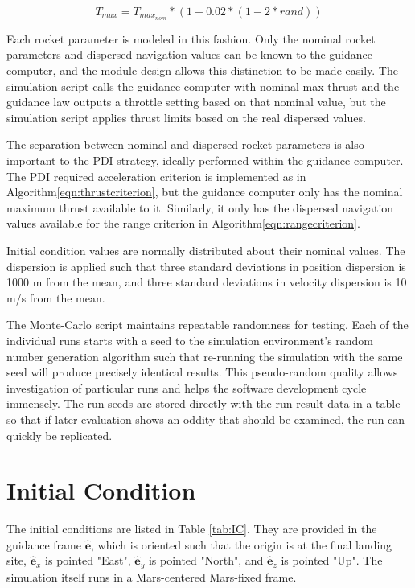\begin{equation}
\label{eqn:thrustdisp}
T_{max} = T_{max_{nom}}*(1+0.02*(1-2*rand))
\end{equation}

Each rocket parameter is modeled in this fashion. Only the nominal rocket parameters and dispersed navigation values can be known to the guidance computer, and the module design allows this distinction to be made easily. The simulation script calls the guidance computer with nominal max thrust and the guidance law outputs a throttle setting based on that nominal value, but the simulation script applies thrust limits based on the real dispersed values. 

The separation between nominal and dispersed rocket parameters is also important to the PDI strategy, ideally performed within the guidance computer. The PDI required acceleration criterion is implemented as in Algorithm\:\ref{eqn:thrustcriterion}, but the guidance computer only has the nominal maximum thrust available to it. Similarly, it only has the dispersed navigation values available for the range criterion in Algorithm\:\ref{eqn:rangecriterion}.

Initial condition values are normally distributed about their nominal values. The dispersion is applied such that three standard deviations in position dispersion is 1000 m from the mean, and three standard deviations in velocity dispersion is 10 m/s from the mean. 

The Monte-Carlo script maintains repeatable randomness for testing. Each of the individual runs starts with a seed to the simulation environment's random number generation algorithm such that re-running the simulation with the same seed will produce precisely identical results. This pseudo-random quality allows investigation of particular runs and helps the software development cycle immensely. The run seeds are stored directly with the run result data in a table so that if later evaluation shows an oddity that should be examined, the run can quickly be replicated.

\section{Initial Condition}
The initial conditions are listed in Table \ref{tab:IC}. They are provided in the guidance frame $\hat{\bm{e}}$, which is oriented such that the origin is at the final landing site, $\hat{\bm{e}}_x$ is pointed "East", $\hat{\bm{e}}_y$ is pointed "North", and $\hat{\bm{e}}_z$ is pointed "Up". The simulation itself runs in a Mars-centered Mars-fixed frame. 


